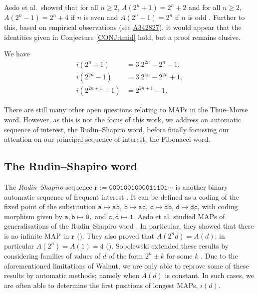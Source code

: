 \documentclass[10pt,a4paper,reqno]{amsart}
\newcommand{\seqnum}[1]{\href{https://oeis.org/#1}{\rm \underline{#1}}}
\newcommand{\bfr}{{\mathbf r}}
\newcommand{\walnut}{{\ttfamily Walnut}}
\begin{document}
Aedo et al.\ showed that for all $n\geq 2$, $A(2^n+1)=2^n+2$ and for all $n\geq 2$, $A(2^n-1)= 2^n+4$ if $n$ is even and $A(2^n-1)=2^n$ if $n$ is odd \cite{aedo2022}. Further to this, based on empirical observations (see \seqnum{A342827}), it would appear that the identities given in Conjecture \ref{CONJ:tmid} hold, but a proof remains elusive.
\begin{conj}\label{CONJ:tmid}
We have
\begin{align*}
    i(2^n+1)&=3.2^{2n}-2^n-1,\\
    i(2^{2n}-1)&=3.2^{4n}-2^{2n}+1,\\
    i(2^{2n+1}-1) &= 2^{2n+1}-1.
\end{align*}
\end{conj}
There are still many other open questions relating to MAPs in the Thue--Morse word. However, as this is not the focus of this work, we address an automatic sequence of interest, the Rudin--Shapiro word, before finally focussing our attention on our principal sequence of interest, the Fibonacci word.


\subsection{The Rudin--Shapiro word}\label{rudinshapiro}
The {\em Rudin--Shapiro} sequence $\bfr:= \mathtt{0001001000011101}\cdots$ 
is another binary automatic sequence of frequent interest \cite{golay1949,shapiro52,rudin59}. It can be defined as a coding of the fixed point of the substitution $\mathtt{a}\mapsto \mathtt{ab},\,\mathtt{b}\mapsto \mathtt{ac},\,\mathtt{c}\mapsto \mathtt{db},\,\mathtt{d}\mapsto \mathtt{dc}$, with coding morphism given by $\mathtt{a},\mathtt{b}\mapsto \mathtt{0}, \text{ and } \mathtt{c},\mathtt{d}\mapsto \mathtt{1}$.
Aedo et al. studied MAPs of generalisations of the Rudin--Shapiro word \cite{aedo2023}. In particular, they showed that there is no infinite MAP in $\bfr$ (\cite[Proposition 41]{aedo2023}). They also proved that $A(2^nd)=A(d)$; in particular $A(2^n)=A(1)=4$ (\cite[Section 4.1]{aedo2023}).
Sobolewski extended these results by considering families of values of $d$ of the form $2^n\pm k$ for some $k$ \cite{sobo23}.
Due to the aforementioned limitations of \walnut{}, we are only able to reprove some of these results by automatic methods; namely when $A(d)$ is constant. In such cases, we are often able to determine the first positions of longest MAPs, $i(d)$.
\end{document}
